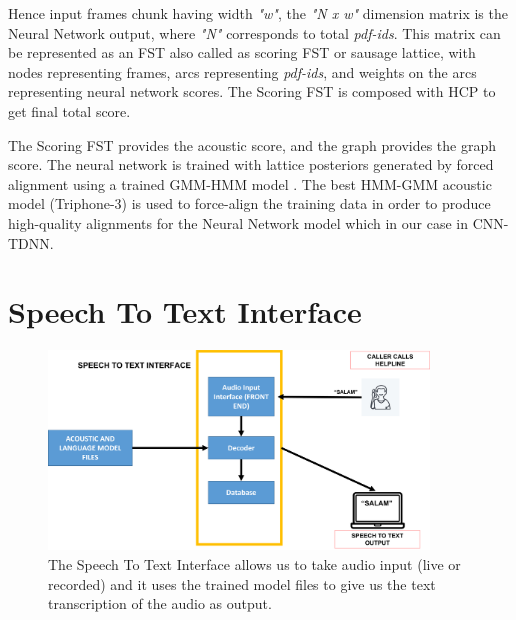 Hence input frames chunk having width \textit{"w"}, the \textit{"N x w"} dimension matrix is the Neural Network output, where \textit{"N"} corresponds to total \textit{pdf-ids}. This matrix can be represented as an FST also called as scoring FST or sausage lattice, with nodes representing frames, arcs representing \textit{pdf-ids}, and weights on the arcs representing neural network scores. The Scoring FST is composed with HCP to get final total score.

The Scoring FST provides the acoustic score, and the graph provides the graph score. The neural network is trained with lattice posteriors generated by forced alignment using a trained GMM-HMM model \cite{raj_experiments_nodate}. The best HMM-GMM acoustic model (Triphone-3) is used to force-align the training data in order to produce high-quality alignments for the Neural Network model which in our case in CNN-TDNN.

\section{Speech To Text Interface} %
\label{sec:STT-interface}

\begin{figure}[h]
    \centering
    \includegraphics[width=0.9\textwidth]{img/STT2.png}
    \caption{The Speech To Text Interface allows us to take audio input (live or recorded) and it uses the trained model files to give us the text transcription of the audio as output.}
    \label{fig:STT-working}
\end{figure}   


